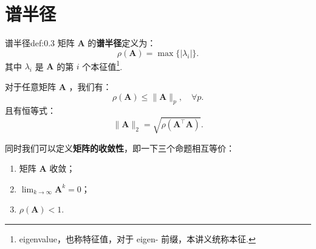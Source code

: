 \section{谱半径}
\begin{definition}{谱半径}{def:0.3}
    矩阵 $\mathbf{A}$ 的{\bf 谱半径}定义为：
    \[
        \rho(\mathbf{A}) = \max\{|\lambda_i|\}.
    \]
    其中 $\lambda_i$ 是 $\mathbf{A}$ 的第 $i$ 个本征值\footnote{eigenvalue，也称特征值，对于 eigen- 前缀，本讲义统称本征.}.
\end{definition}
对于任意矩阵 $\mathbf{A}$ ，我们有：
\[
    \rho(\mathbf{A}) \leqslant \|\mathbf{A}\|_p,\quad \forall p.
\]
且有恒等式：
\[
    \|  \mathbf{A}\|_2 = \sqrt{\rho(\mathbf{A}^\top\mathbf{A})}.
\]

同时我们可以定义{\bf 矩阵的收敛性}，即一下三个命题相互等价：
\begin{enumerate}
    \item 矩阵 $\mathbf{A}$ 收敛；
    \item $\lim_{k\to \infty} \mathbf{A}^k = 0$；
    \item $\rho(\mathbf{A})<1$.
\end{enumerate}
